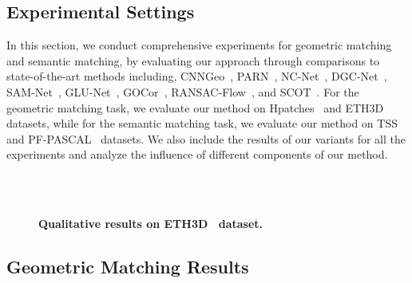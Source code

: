 \documentclass[10pt,twocolumn,letterpaper]{article}
\begin{document}
\subsection{Experimental Settings}\label{sec:4_2}
In this section, we conduct comprehensive experiments for geometric matching and semantic matching, by evaluating our approach through comparisons to state-of-the-art methods including, CNNGeo~\cite{rocco2017convolutional}, PARN~\cite{jeon2018parn}, NC-Net~\cite{rocco2018neighbourhood}, DGC-Net~\cite{melekhov2019dgc}, SAM-Net~\cite{kim2019semantic}, GLU-Net~\cite{truong2020glu}, GOCor~\cite{truong2020gocor}, RANSAC-Flow~\cite{shen2020ransac}, and SCOT~\cite{liu2020semantic}. For the geometric matching task, we evaluate our method on Hpatches~\cite{balntas2017hpatches} and ETH3D~\cite{schops2017multi} datasets, while for the semantic matching task, we evaluate our method on TSS~\cite{taniai2016joint} and PF-PASCAL~\cite{ham2016proposal} datasets. We also include the results of our variants for all the experiments and analyze the influence of different components of our method. 
\begin{figure}[t]
	\centering
	\renewcommand{\thesubfigure}{}
	\hfill
	\hfill
	\hfill
	\hfill\\
	\vspace{-21.5pt}
	\hfill
	\hfill
	\hfill
	\hfill\\
    \caption{\textbf{Qualitative results on ETH3D~\cite{schops2017multi} dataset.}}\vspace{-10pt}\label{img:7}
\end{figure}

\subsection{Geometric Matching Results}\label{sec:4_3}
\end{document}
